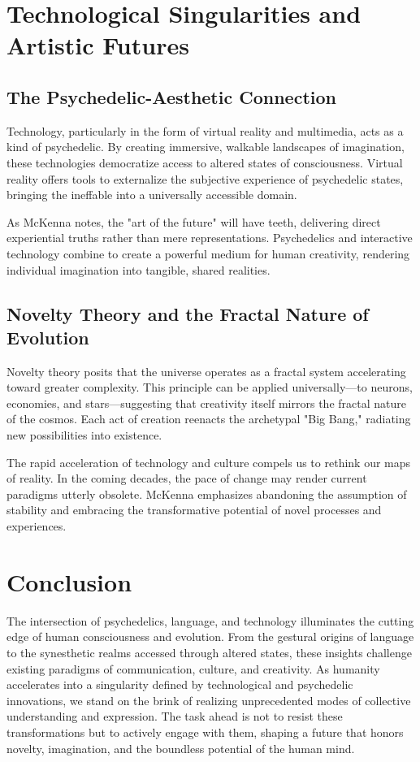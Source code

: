 \documentclass[12pt]{article}
\begin{document}
\section*{Technological Singularities and Artistic Futures}

\subsection*{The Psychedelic-Aesthetic Connection}

Technology, particularly in the form of virtual reality and multimedia, acts as a kind of psychedelic. By creating immersive, walkable landscapes of imagination, these technologies democratize access to altered states of consciousness. Virtual reality offers tools to externalize the subjective experience of psychedelic states, bringing the ineffable into a universally accessible domain.

As McKenna notes, the "art of the future" will have teeth, delivering direct experiential truths rather than mere representations. Psychedelics and interactive technology combine to create a powerful medium for human creativity, rendering individual imagination into tangible, shared realities.

\subsection*{Novelty Theory and the Fractal Nature of Evolution}

Novelty theory posits that the universe operates as a fractal system accelerating toward greater complexity. This principle can be applied universally—to neurons, economies, and stars—suggesting that creativity itself mirrors the fractal nature of the cosmos. Each act of creation reenacts the archetypal "Big Bang," radiating new possibilities into existence.

The rapid acceleration of technology and culture compels us to rethink our maps of reality. In the coming decades, the pace of change may render current paradigms utterly obsolete. McKenna emphasizes abandoning the assumption of stability and embracing the transformative potential of novel processes and experiences.

\section*{Conclusion}

The intersection of psychedelics, language, and technology illuminates the cutting edge of human consciousness and evolution. From the gestural origins of language to the synesthetic realms accessed through altered states, these insights challenge existing paradigms of communication, culture, and creativity. As humanity accelerates into a singularity defined by technological and psychedelic innovations, we stand on the brink of realizing unprecedented modes of collective understanding and expression. The task ahead is not to resist these transformations but to actively engage with them, shaping a future that honors novelty, imagination, and the boundless potential of the human mind.
\end{document}
